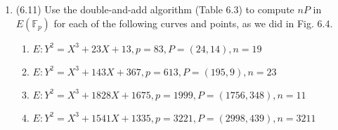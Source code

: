 \documentclass[12pt]{amsart}
\theoremstyle{definition}
\begin{document}
\begin{enumerate}
	\item (6.11) Use the double-and-add algorithm (Table 6.3) to compute $nP$ 
		in $E(\mathbb{F}_p)$ for each of the following curves and points, 
		as we did in Fig. 6.4. 
	\begin{enumerate}
		\item $E : Y^2 = X^3 + 23X + 13, p = 83, P = (24,14), n = 19$
		\item $E : Y^2 = X^3 + 143X + 367, p = 613, P = (195,9), n = 23$
		\item $E : Y^2 = X^3 + 1828X + 1675, p = 1999, P = (1756,348), n = 11$
		\item $E : Y^2 = X^3 + 1541X + 1335, p = 3221, P = (2998,439), n = 3211$
	\end{enumerate}
\end{enumerate}
\end{document}
